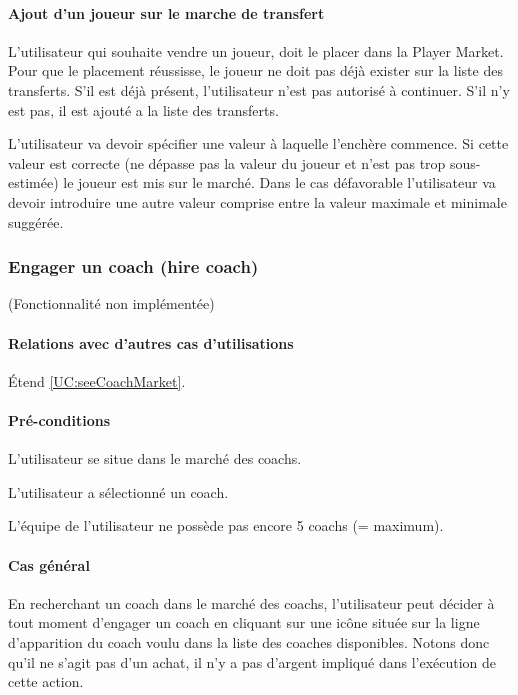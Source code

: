 \paragraph{Ajout d'un joueur sur le marche de transfert}
\begin{list}{}{\leftmargin=1.5em}
\item{L'utilisateur qui souhaite vendre un joueur, doit le placer dans la Player Market. Pour que le placement réussisse, le joueur ne doit pas déjà exister sur la liste des transferts. S'il est déjà présent, l'utilisateur n'est pas autorisé à continuer. S'il n'y est pas, il est ajouté a la liste des transferts.}
\item{L'utilisateur va devoir spécifier une valeur à laquelle l'enchère commence. Si cette valeur est correcte (ne dépasse pas la valeur du joueur et n'est pas trop sous-estimée) le joueur est mis sur le marché. Dans le cas défavorable l'utilisateur va devoir introduire une autre valeur comprise entre la valeur maximale et minimale suggérée.}
\end{list}

\subsubsection{Engager un coach (hire coach)}
\label{UC:hireCoach}
(Fonctionnalité non implémentée)
\paragraph{Relations avec d'autres cas d'utilisations}
Étend \ref{UC:seeCoachMarket}.
\paragraph{Pré-conditions}
\begin{list}{}{\leftmargin=1.5em}
\item{L'utilisateur se situe dans le marché des coachs.}
\item{L'utilisateur a sélectionné un coach.}
\item{L'équipe de l'utilisateur ne possède pas encore 5 coachs (= maximum).}
\end{list}
\paragraph{Cas général}
En recherchant un coach dans le marché des coachs, l'utilisateur peut décider à tout moment d'engager un coach en cliquant sur une icône située sur la ligne d'apparition du coach voulu dans la liste des coaches disponibles. Notons donc qu'il ne s'agit pas d'un achat, il n'y a pas d'argent impliqué dans l'exécution de cette action. 
